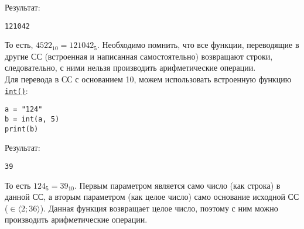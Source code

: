 \documentclass[12pt]{article}
\theoremstyle{problem_style}
\begin{document}
Результат:
\begin{verbatim}
121042
\end{verbatim}
То есть, $4522_{10} = 121042_5$. Необходимо помнить, что все функции, переводящие в другие СС (встроенная и написанная самостоятельно) возвращают строки, следовательно, с ними нельзя производить арифметические операции.\\
Для перевода в СС с основанием 10, можем использовать встроенную функцию \href{https://docs.python.org/3/library/functions.html#int}{\texttt{int()}}:
\begin{verbatim}
a = "124"
b = int(a, 5)
print(b)
\end{verbatim}
Результат:
\begin{verbatim}
39
\end{verbatim}
То есть $124_5 = 39_{10}$. Первым параметром является само число (как строка) в данной СС, а вторым параметром (как целое число) само основание исходной СС ($\in \langle 2; 36 \rangle $). Данная функция возвращает целое число, поэтому с ним можно производить арифметические операции.
\end{document}

